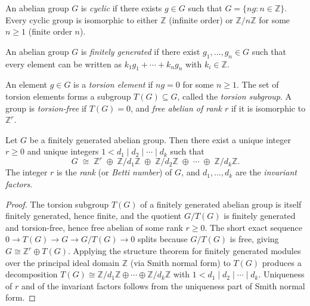 \begin{definition}
    \label{def:cyclic-group}
    An abelian group $G$ is \emph{cyclic} if there exists $g \in G$ such that
    $G = \{ ng : n \in \mathbb{Z} \}$. Every cyclic group is isomorphic to either $\mathbb{Z}$
    (infinite order) or $\mathbb{Z}/n\mathbb{Z}$ for some $n \ge 1$ (finite order $n$).
\end{definition}

\begin{definition}
    \label{def:finitely-generated}
    An abelian group $G$ is \emph{finitely generated} if there exist $g_1, \dots, g_n \in G$
    such that every element can be written as $k_1 g_1 + \cdots + k_n g_n$ with
    $k_i \in \mathbb{Z}$.
\end{definition}

\begin{definition}
    \label{def:torsion-free-part}
    An element $g \in G$ is a \emph{torsion element} if $ng = 0$ for some $n \ge 1$. The set
    of torsion elements forms a subgroup $T(G) \subseteq G$, called the \emph{torsion subgroup}.
    A group is \emph{torsion-free} if $T(G) = 0$, and \emph{free abelian of rank $r$} if it is
    isomorphic to $\mathbb{Z}^r$.
\end{definition}

\begin{theorem}
    \label{thm:invariant-factor-form}
    Let $G$ be a finitely generated abelian group. Then there exist a unique integer
    $r \ge 0$ and unique integers $1 < d_1 \mid d_2 \mid \cdots \mid d_k$ such that
    \[
        G \;\cong\; \mathbb{Z}^r \;\oplus\; \mathbb{Z}/d_1\mathbb{Z} \;\oplus\;
        \mathbb{Z}/d_2\mathbb{Z} \;\oplus\; \cdots \;\oplus\; \mathbb{Z}/d_k\mathbb{Z}.
    \]
    The integer $r$ is the \emph{rank} (or \emph{Betti number}) of $G$, and
    $d_1, \dots, d_k$ are the \emph{invariant factors}.
\end{theorem}
\begin{proof}
    The torsion subgroup $T(G)$ of a finitely generated abelian group is itself finitely
    generated, hence finite, and the quotient $G / T(G)$ is finitely generated and torsion-free,
    hence free abelian of some rank $r \ge 0$. The short exact sequence $0 \to T(G) \to G
    \to G/T(G) \to 0$ splits because $G/T(G)$ is free, giving $G \cong \mathbb{Z}^r \oplus T(G)$.
    Applying the structure theorem for finitely generated modules over the principal ideal
    domain $\mathbb{Z}$ (via Smith normal form) to $T(G)$ produces a decomposition
    $T(G) \cong \mathbb{Z}/d_1\mathbb{Z} \oplus \cdots \oplus \mathbb{Z}/d_k\mathbb{Z}$ with
    $1 < d_1 \mid d_2 \mid \cdots \mid d_k$. Uniqueness of $r$ and of the invariant factors
    follows from the uniqueness part of Smith normal form.
\end{proof}

